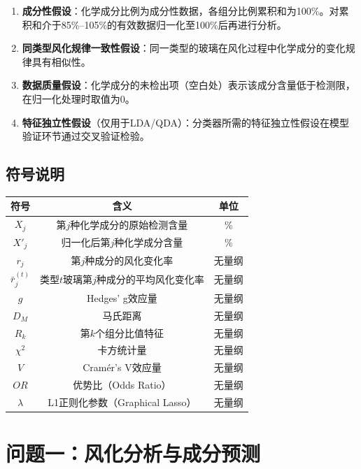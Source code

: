 \documentclass[fontset=windows, 12pt, a4paper]{ctexart}
\begin{document}
\begin{enumerate}
\item \textbf{成分性假设}：化学成分比例为成分性数据，各组分比例累积和为100\%。对累积和介于85\%--105\%的有效数据归一化至100\%后再进行分析。
\item \textbf{同类型风化规律一致性假设}：同一类型的玻璃在风化过程中化学成分的变化规律具有相似性。
\item \textbf{数据质量假设}：化学成分的未检出项（空白处）表示该成分含量低于检测限，在归一化处理时取值为0。
\item \textbf{特征独立性假设}（仅用于LDA/QDA）：分类器所需的特征独立性假设在模型验证环节通过交叉验证检验。
\end{enumerate}

\subsection{符号说明}

\begin{center}
\begin{tabular}{c|c|c}
\toprule
\textbf{符号} & \textbf{含义} & \textbf{单位} \\
\midrule
$X_j$ & 第$j$种化学成分的原始检测含量 & \% \\
$X'_j$ & 归一化后第$j$种化学成分含量 & \% \\
$r_j$ & 第$j$种成分的风化变化率 & 无量纲 \\
$\bar{r}_j^{(t)}$ & 类型$t$玻璃第$j$种成分的平均风化变化率 & 无量纲 \\
$g$ & Hedges' g效应量 & 无量纲 \\
$D_M$ & 马氏距离 & 无量纲 \\
$R_k$ & 第$k$个组分比值特征 & 无量纲 \\
$\chi^2$ & 卡方统计量 & 无量纲 \\
$V$ & Cram\'er's V效应量 & 无量纲 \\
$OR$ & 优势比（Odds Ratio） & 无量纲 \\
$\lambda$ & L1正则化参数（Graphical Lasso） & 无量纲 \\
\bottomrule
\end{tabular}
\end{center}

\newpage

\section{问题一：风化分析与成分预测}
\end{document}

